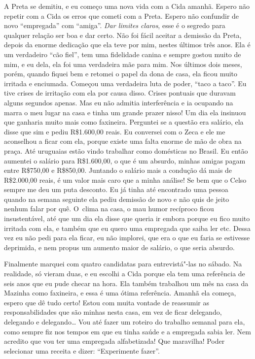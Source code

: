 A Preta se demitiu, e eu começo uma nova vida com a Cida amanhã. Espero
não repetir com a Cida os erros que cometi com a Preta. Espero não
confundir de novo ``empregada'' com ``amiga''. \emph{Dar limites
claros}, esse é o segredo para qualquer relação ser boa e dar certo. Não
foi fácil aceitar a demissão da Preta, depois da enorme dedicação que
ela teve por mim, nestes últimos três anos. Ela é um verdadeiro ``cão
fiel'', tem uma fidelidade canina e sempre gostou muito de mim, e eu
dela, ela foi uma verdadeira mãe para mim. Nos últimos dois meses,
porém, quando fiquei bem e retomei o papel da dona de casa, ela ficou
muito irritada e enciumada. Começou uma verdadeira luta de poder, ``taco
a taco''. Eu tive crises de irritação com ela por causa disso. Crises
pontuais que duravam alguns segundos apenas. Mas eu não admitia
interferência e ia ocupando na marra o meu lugar na casa e tinha um
grande prazer nisso! Um dia ela insinuou que ganharia muito mais como
faxineira. Perguntei se a questão era salário, ela disse que sim e pediu
R\$1.600,00 reais. Eu conversei com o Zeca e ele me aconselhou a ficar
com ela, porque existe uma falta enorme de mão de obra na praça. Até
uruguaias estão vindo trabalhar como domésticas no Brasil. Eu então
aumentei o salário para R\$1.600,00, o que é um absurdo, minhas amigas
pagam entre R\$750,00 e R\$850,00. Juntando o salário mais a condução dá
mais de R\$2.000,00 reais, é um valor mais caro que a minha análise! Se
bem que o Celso sempre me deu um puta desconto. Eu já tinha até
encontrado uma pessoa quando na semana seguinte ela pediu demissão de
novo e não quis de jeito nenhum falar por quê. O~clima na casa, o mau
humor recíproco ficou insustentável, até que um dia ela disse que queria
ir embora porque eu fico muito irritada com ela, e também que eu quero
uma empregada que saiba ler etc. Dessa vez eu não pedi para ela ficar,
eu não implorei, que era o que eu faria se estivesse deprimida, e nem
propus um aumento maior de salário, o que seria absurdo.

Finalmente marquei com quatro candidatas para entrevistá"-las no sábado.
Na realidade, só vieram duas, e eu escolhi a Cida porque ela tem uma
referência de seis anos que eu pude checar na hora. Ela também trabalhou
um mês na casa da Mazinha como faxineira, e essa é uma ótima referência.
Amanhã ela começa, espero que dê tudo certo! Estou com muita vontade de
reassumir as responsabilidades que são minhas nesta casa, em vez de
ficar delegando, delegando e delegando… Vou até fazer um roteiro
do trabalho semanal para ela, como sempre fiz nos tempos em que eu tinha
saúde e a empregada sabia ler. Nem acredito que vou ter uma empregada
alfabetizada! Que maravilha! Poder selecionar uma receita e dizer:
``Experimente fazer''.

